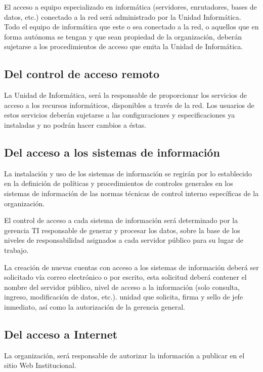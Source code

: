 \documentclass{book}
\begin{document}
                El acceso a equipo especializado en informática (servidores, enrutadores, bases
                de datos, etc.) conectado a la red será administrado por la Unidad Informática.
                Todo el equipo de informática que este o sea conectado a la red, o aquellos que
                en forma autónoma se tengan y que sean propiedad de la organización, deberán sujetarse a
                los procedimientos de acceso que emita la Unidad de Informática.
            \

            \subsection{Del control de acceso remoto}
                La Unidad de Informática, será la responsable de proporcionar los servicios de
                acceso a los recursos informáticos, disponibles a través de la red.
                Los usuarios de estos servicios deberán sujetarse a las configuraciones y
                especificaciones ya instaladas y no podrán hacer cambios a éstas.
            \

            \subsection{Del acceso a los sistemas de información}
                La instalación y uso de los sistemas de información se regirán por lo establecido
                en la definición de políticas y procedimientos de controles generales en los sistemas de
                información de las normas técnicas de control interno específicas de la organización.

                El control de acceso a cada sistema de información será determinado por la
                gerencia TI responsable de generar y procesar los datos, sobre la base de los
                niveles de responsabilidad asignados a cada servidor público para su lugar de trabajo.
                
                La creación de nuevas cuentas con acceso a los sistemas de información deberá
                ser solicitado vía correo electrónico o por escrito, esta solicitud deberá contener el
                nombre del servidor público, nivel de acceso a la información (solo consulta, ingreso,
                modificación de datos, etc.). unidad que solicita, firma y sello de jefe inmediato, así
                como la autorización de la gerencia general.
            \
            
            \subsection{Del acceso a Internet}
                La organización, será responsable de autorizar la información a
                publicar en el sitio Web Institucional.
\end{document}
